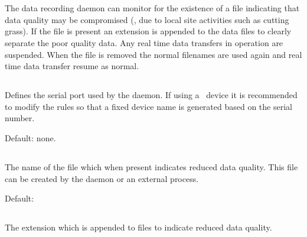 \section{\code{[dataqualitymonitor]}}

The data recording daemon can monitor for the existence of a file
indicating that data quality may be compromised (\eg, due to local
site activities such as cutting grass). If the file is present an
extension is appended to the data files to clearly separate the poor
quality data. Any real time data transfers in operation are
suspended. When the file is removed the normal filenames are used
again and real time data transfer resume as normal.

\subsection{}
Defines the serial port used by the 
daemon. If using a \usb\ device it is recommended to modify the
 rules so that a fixed device name is generated based on
the serial number. 


Default: none.

\subsection{}
The name of the file which when present indicates reduced data
quality. This file can be created by the 
daemon or an external process.

Default: 

\subsection{}
The extension which is appended to files to indicate reduced data
quality.

